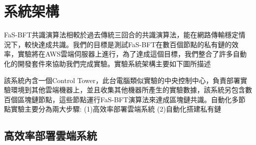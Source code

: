 \section{系統架構}\label{se_5}  
FaS-BFT共識演算法相較於過去傳統三回合的共識演算法，能在網路傳輸穩定情況下，較快達成共識。我們的目標是測試FaS-BFT在數百個節點的私有鏈的效率，實驗將在AWS雲端伺服器上進行，為了達成這個目標，我們整合了許多自動化的開發套件來協助我們完成實驗。實驗系統架構主要如下圖所描述 



該系統內含一個Control Tower，此台電腦類似實驗的中央控制中心，負責部署實驗環境到其他雲端機器上，並且收集其他機器所產生的實驗數據，該系統另包含數百個區塊鏈節點，這些節點運行FaS-BFT演算法來達成區塊鏈共識。自動化多節點實驗主要分為兩大步驟: (1)高效率部署雲端系統 (2)自動化搭建私有鏈
\subsection{高效率部署雲端系統}\label{se_5} 

